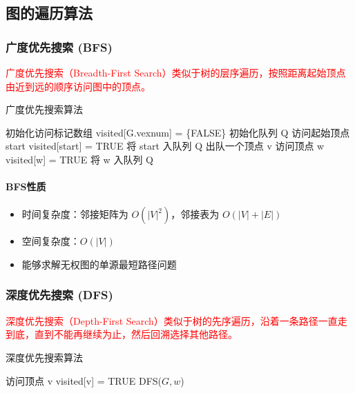 \documentclass{../../note}
\begin{document}
\subsection{图的遍历算法}

\subsubsection{广度优先搜索 (BFS)}

\textcolor{red}{广度优先搜索（Breadth-First Search）类似于树的层序遍历，按照距离起始顶点由近到远的顺序访问图中的顶点。}

\begin{algorithm}
\caption{广度优先搜索算法}
\begin{algorithmic}[1]
  \State 初始化访问标记数组 visited[G.vexnum] = \{FALSE\}
  \State 初始化队列 Q
  \State 访问起始顶点 start
  \State visited[start] = TRUE
  \State 将 start 入队列 Q
  \State 出队一个顶点 v
  \State 访问顶点 w
  \State visited[w] = TRUE
  \State 将 w 入队列 Q
  \EndIf
  \EndFor
  \EndWhile
  \EndProcedure
\end{algorithmic}
\end{algorithm}

\paragraph{BFS性质}
\begin{itemize}
\item 时间复杂度：邻接矩阵为 $O(|V|^2)$，邻接表为 $O(|V|+|E|)$
\item 空间复杂度：$O(|V|)$
\item 能够求解无权图的单源最短路径问题
\end{itemize}

\subsubsection{深度优先搜索 (DFS)}

\textcolor{red}{深度优先搜索（Depth-First Search）类似于树的先序遍历，沿着一条路径一直走到底，直到不能再继续为止，然后回溯选择其他路径。}

\begin{algorithm}
\caption{深度优先搜索算法}
\begin{algorithmic}[1]
  \State 访问顶点 v
  \State visited[v] = TRUE
  \State DFS($G, w$)
  \EndIf
  \EndFor
  \EndProcedure
\end{algorithmic}
\end{algorithm}
\end{document}
